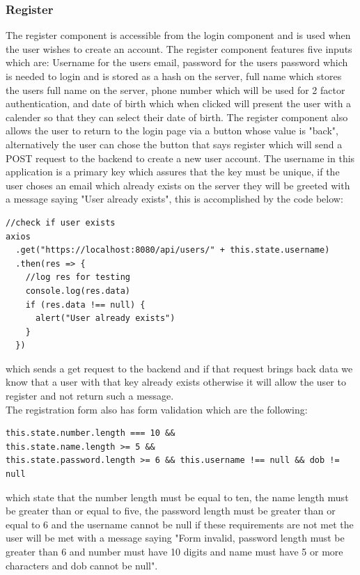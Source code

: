 \subsubsection{Register}
The register component is accessible from the login component and is used when the
user wishes to create an account.  The register component features five inputs which
are: Username for the users email, password for the users password which is needed to login and is stored as a hash on the server,
full name which stores the users full name on the server, phone number which will be used for
2 factor authentication, and date of birth which when clicked will present the user with a calender
so that they can select their date of birth.  The register component also allows the user to return
to the login page via a button whose value is "back", alternatively the user can chose the button that
says register which will send a POST request to the backend to create a new user account.  The username
in this application is a primary key which assures that the key must be unique, if the user choses an
email which already exists on the server they will be greeted with a message saying "User already exists",
this is accomplished by the code below:
\begin{verbatim}
//check if user exists
axios
  .get("https://localhost:8080/api/users/" + this.state.username)
  .then(res => {
    //log res for testing
    console.log(res.data)
    if (res.data !== null) {
      alert("User already exists")
    }
  })
\end{verbatim}
which sends a get request to the backend and if that request brings back data we know that a
user with that key already exists otherwise it will allow the user to register and not return such
a message.
\\
The registration form also has form validation which are the following:
\begin{verbatim}
this.state.number.length === 10 &&
this.state.name.length >= 5 &&
this.state.password.length >= 6 && this.username !== null && dob != null
\end{verbatim}
which state that the number length must be equal to ten, the name length must be greater than or equal to five, the password length must be greater than or equal to 6 and the username cannot be null if these requirements are not met the user will be met with a message saying "Form invalid, password length must be greater than 6 and number must have 10 digits and  name must have 5 or more characters and dob cannot be null".
\\
